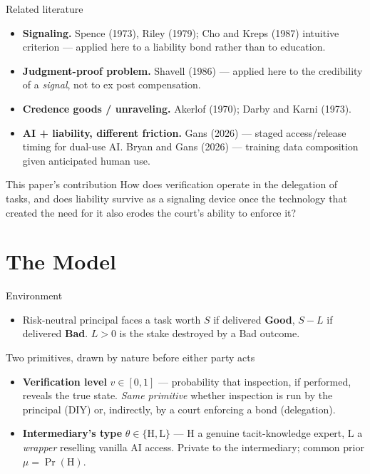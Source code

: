 \documentclass[11pt,aspectratio=169]{beamer}
\newcommand{\Ht}{\mathrm{H}}
\newcommand{\Lt}{\mathrm{L}}
\begin{document}
\begin{frame}{Related literature}
\begin{itemize}
  \item \textbf{Signaling.} Spence (1973), Riley (1979); Cho and Kreps (1987) intuitive criterion --- applied here to a liability bond rather than to education.
  \item \textbf{Judgment-proof problem.} Shavell (1986) --- applied here to the credibility of a \emph{signal}, not to ex post compensation.
  \item \textbf{Credence goods / unraveling.} Akerlof (1970); Darby and Karni (1973).
  \item \textbf{AI + liability, different friction.} Gans (2026) --- staged access/release timing for dual-use AI. Bryan and Gans (2026) --- training data composition given anticipated human use.
\end{itemize}
\vfill
\begin{alertblock}{This paper's contribution}
How does verification operate in the delegation of tasks, and does liability survive as a signaling device once the technology that created the need for it also erodes the court's ability to enforce it?
\end{alertblock}
\end{frame}

\section{The Model}

\begin{frame}{Environment}
\begin{itemize}
  \item Risk-neutral principal faces a task worth $S$ if delivered \textbf{Good}, $S-L$ if delivered \textbf{Bad}. $L>0$ is the stake destroyed by a Bad outcome.
\end{itemize}
\vfill
\begin{block}{Two primitives, drawn by nature before either party acts}
\begin{itemize}
  \item \textbf{Verification level} $v\in[0,1]$ --- probability that inspection, if performed, reveals the true state. \emph{Same primitive} whether inspection is run by the principal (DIY) or, indirectly, by a court enforcing a bond (delegation).
  \item \textbf{Intermediary's type} $\theta\in\{\Ht,\Lt\}$ --- $\Ht$ a genuine tacit-knowledge expert, $\Lt$ a \emph{wrapper} reselling vanilla AI access. Private to the intermediary; common prior $\mu=\Pr(\Ht)$.
\end{itemize}
\end{block}
\end{frame}
\end{document}
